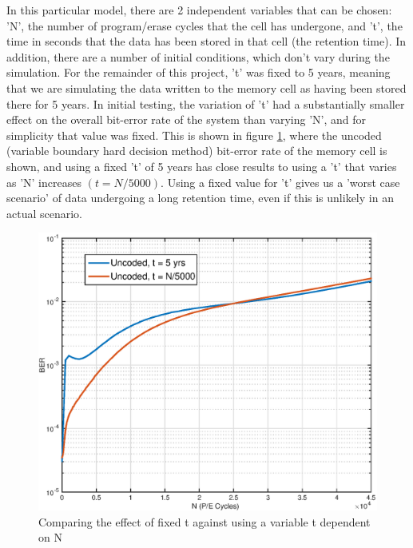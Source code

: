 \documentclass[11pt]{article}
\numberwithin{equation}{subsection}
\begin{document}
In this particular model, there are 2 independent variables that can be chosen: 'N', the number of program/erase cycles that the cell has undergone, and 't', the time in seconds that the data has been stored in that cell (the retention time). In addition, there are a number of initial conditions, which don't vary during the simulation. For the remainder of this project, 't' was fixed to 5 years, meaning that we are simulating the data written to the memory cell as having been stored there for 5 years. In initial testing, the variation of 't' had a substantially smaller effect on the overall bit-error rate of the system than varying 'N', and for simplicity that value was fixed. This is shown in figure \ref{fig:retention_time_graph}, where the uncoded (variable boundary hard decision method) bit-error rate of the memory cell is shown, and using a fixed 't' of 5 years has close results to using a 't' that varies as 'N' increases $(t = N/5000)$. Using a fixed value for 't' gives us a 'worst case scenario' of data undergoing a long retention time, even if this is unlikely in an actual scenario.
\begin{figure}[ht]
\centering
\includegraphics[scale=0.45]{retention_time_graph}
\caption{Comparing the effect of fixed t against using a variable t dependent on N}
\label{fig:retention_time_graph}
\end{figure}
\end{document}
